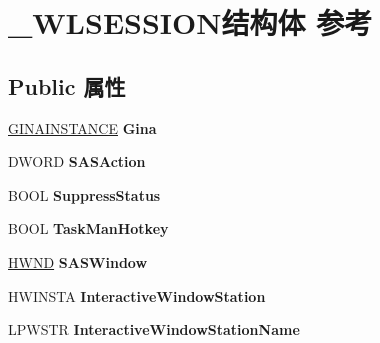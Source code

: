 \hypertarget{struct___w_l_s_e_s_s_i_o_n}{}\section{\+\_\+\+W\+L\+S\+E\+S\+S\+I\+O\+N结构体 参考}
\label{struct___w_l_s_e_s_s_i_o_n}
\subsection*{Public 属性}
\begin{DoxyCompactItemize}
\item 
\mbox{\label{struct___w_l_s_e_s_s_i_o_n_af80312676408abfb4a82319a679230c2}} 
\hyperlink{struct___g_i_n_a_i_n_s_t_a_n_c_e}{G\+I\+N\+A\+I\+N\+S\+T\+A\+N\+CE} {\bfseries Gina}
\item 
\mbox{\label{struct___w_l_s_e_s_s_i_o_n_ae7437c8b3a1c70eae61d2caa6f018468}} 
D\+W\+O\+RD {\bfseries S\+A\+S\+Action}
\item 
\mbox{\label{struct___w_l_s_e_s_s_i_o_n_a63afcdafbbcdbbb6b1ac1300562692cd}} 
B\+O\+OL {\bfseries Suppress\+Status}
\item 
\mbox{\label{struct___w_l_s_e_s_s_i_o_n_a9523153f0cc9b82040d71cc341f9b2c5}} 
B\+O\+OL {\bfseries Task\+Man\+Hotkey}
\item 
\mbox{\label{struct___w_l_s_e_s_s_i_o_n_af2c5e153c076c0c7a9244b5a6ee32b2e}} 
\hyperlink{interfacevoid}{H\+W\+ND} {\bfseries S\+A\+S\+Window}
\item 
\mbox{\label{struct___w_l_s_e_s_s_i_o_n_a57872173e07f87105e8afb1d6401a21c}} 
H\+W\+I\+N\+S\+TA {\bfseries Interactive\+Window\+Station}
\item 
\mbox{\label{struct___w_l_s_e_s_s_i_o_n_a25a727860e075fbc142e8461fb3902a9}} 
L\+P\+W\+S\+TR {\bfseries Interactive\+Window\+Station\+Name}
\item 
\mbox{\label{struct___w_l_s_e_s_s_i_o_n_af88a2ff95634f86045849dffb7ea9ffa}} 

\end{DoxyCompactItemize}
